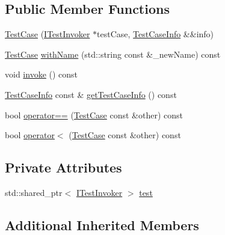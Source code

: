 \subsection*{Public Member Functions}
\begin{DoxyCompactItemize}
\item 
\hyperlink{class_catch_1_1_test_case_aae5709fc1cb68e19ab0ac27e1ffd6a76}{Test\-Case} (\hyperlink{struct_catch_1_1_i_test_invoker}{I\-Test\-Invoker} $\ast$test\-Case, \hyperlink{struct_catch_1_1_test_case_info}{Test\-Case\-Info} \&\&info)
\item 
\hyperlink{class_catch_1_1_test_case}{Test\-Case} \hyperlink{class_catch_1_1_test_case_ab6dbc6c82b7c1680013c67bdedccfc8e}{with\-Name} (std\-::string const \&\-\_\-new\-Name) const 
\item 
void \hyperlink{class_catch_1_1_test_case_aac2e028135cc88c3e3aac04650960a6c}{invoke} () const 
\item 
\hyperlink{struct_catch_1_1_test_case_info}{Test\-Case\-Info} const \& \hyperlink{class_catch_1_1_test_case_a25c03661ab092431cdff10df5c58a5a7}{get\-Test\-Case\-Info} () const 
\item 
bool \hyperlink{class_catch_1_1_test_case_a40eab521b316c7d476f6b4dd1c33eec8}{operator==} (\hyperlink{class_catch_1_1_test_case}{Test\-Case} const \&other) const 
\item 
bool \hyperlink{class_catch_1_1_test_case_aa5174e85e3aac6e7398dee9c76730324}{operator$<$} (\hyperlink{class_catch_1_1_test_case}{Test\-Case} const \&other) const 
\end{DoxyCompactItemize}
\subsection*{Private Attributes}
\begin{DoxyCompactItemize}
\item 
std\-::shared\-\_\-ptr$<$ \hyperlink{struct_catch_1_1_i_test_invoker}{I\-Test\-Invoker} $>$ \hyperlink{class_catch_1_1_test_case_a7aaa375d6f2bda735095eaa43395b54b}{test}
\end{DoxyCompactItemize}
\subsection*{Additional Inherited Members}


